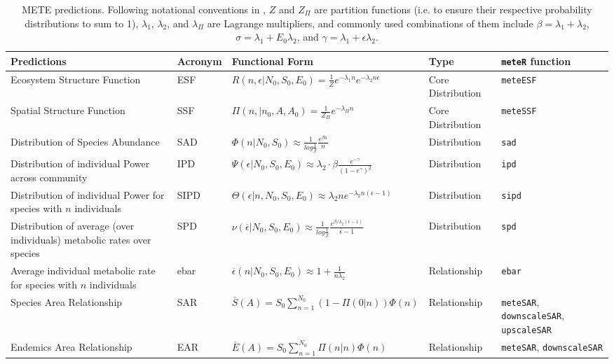 \begin{table}[!hp]
\caption[METE predictions]{METE predictions. Following notational
  conventions in \citet{Harte:2011ut}, $Z$ and $Z_{\Pi}$ are partition
  functions (i.e. to ensure their respective probability distributions
  to sum to 1), $\lambda_1$, $\lambda_2$, and $\lambda_\Pi$ are
  Lagrange multipliers, and commonly used combinations of them include
  $\beta = \lambda_1 + \lambda_2$, $\sigma = \lambda_1 +
  E_0\lambda_2$, and $\gamma=\lambda_{1} + \epsilon \lambda_{2}$.} 
\label{tab:metrics}
\small
\begin{tabular}{L{4cm} p{1.2cm} L{5.4cm} p{2cm} p{2cm}}
  \hline
 Predictions & Acronym & Functional Form & Type & \texttt{meteR} function\\ 
  \hline
      Ecosystem Structure Function & ESF & $R(n,\epsilon | N_0, S_0,E_0) = \frac{1}{Z} e^{-\lambda_1n} e^{-\lambda_2n\epsilon}$  & Core Distribution & \texttt{meteESF} \\ 
	Spatial Structure Function & SSF & $\Pi(n,|n_0, A, A_0) = \frac{1}{Z_\Pi} e^{-\lambda_\Pi n}$& Core Distribution & \texttt{meteSSF} \\
	Distribution of Species Abundance & SAD & $\Phi(n|N_0, S_0)\approx \frac{1}{log\frac{1}{\beta}} \frac{e^{\beta n}}{n}$ & Distribution & \texttt{sad} \\ 
 	Distribution of individual Power across community & IPD & $\Psi(\epsilon|N_0, S_0, E_0)\approx  \lambda_2 \cdot \beta \frac{e^{-\gamma}}{(1-e^{\gamma})^2} $& Distribution & \texttt{ipd} \\
	Distribution of individual Power for species with $n$ individuals & SIPD & $\Theta(\epsilon | n,N_0, S_0, E_0)\approx \lambda_2ne^{-\lambda_2n(\epsilon-1)}$ & Distribution & \texttt{sipd} \\
	Distribution of average (over individuals) metabolic rates over species & SPD & $\nu (\overline{\epsilon} |  N_0, S_0,E_0) \approx \frac{1}{log\frac{1}{\beta}}  \frac{e^{\beta / \lambda_2(\overline{\epsilon} -1)}}{\overline{\epsilon} -1}$ & Distribution & \texttt{spd} \\
	Average individual metabolic rate for species with $n$ individuals & ebar & $\overline{\epsilon}(n | N_0, S_0,E_0) \approx 1 + \frac{1}{n\lambda_2}$ & Relationship & \texttt{ebar} \\
	Species Area Relationship & SAR & $\bar{S}(A) = S_0 \sum_{n=1}^{N_0} \left(1 - \Pi(0 | n)\right) \Phi(n)$ & Relationship & \texttt{meteSAR}, \verb|downscaleSAR|, \verb|upscaleSAR| \\
	Endemics Area Relationship & EAR & $\bar{E}(A) = S_0 \sum_{n=1}^{N_0} \Pi(n | n) \Phi(n)$ & Relationship & \verb|meteSAR|, \verb|downscaleSAR| \\
   \hline
\end{tabular}
\end{table}

